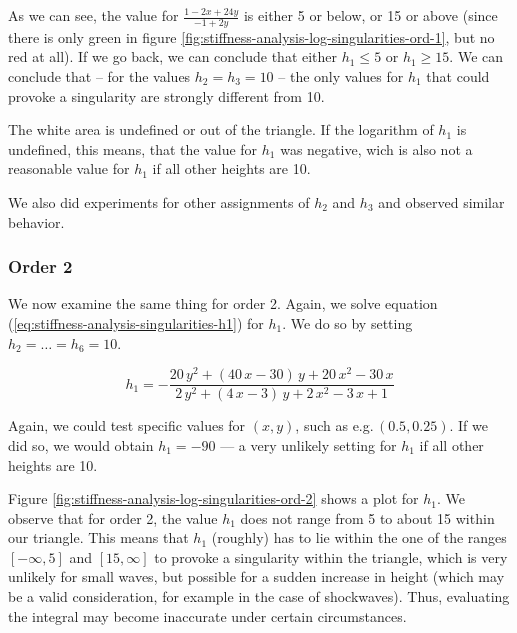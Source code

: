 \documentclass{article}
\begin{document}
As we can see, the value for $\frac{1-2x+24y}{-1+2y}$ is either 5 or below, or 15 or above (since there is only green in figure \ref{fig:stiffness-analysis-log-singularities-ord-1}, but no red at all). If we go back, we can conclude that either $h_1 \leq 5$ or $h_1 \geq 15$. We can conclude that -- for the values $h_2=h_3=10$ -- the only values for $h_1$ that could provoke a singularity are strongly different from 10.

The white area is undefined or out of the triangle. If the logarithm of $h_1$ is undefined, this means, that the value for $h_1$ was negative, wich is also not a reasonable value for $h_1$ if all other heights are 10.

We also did experiments for other assignments of $h_2$ and $h_3$ and observed similar behavior.

\subsubsection{Order 2}
\label{sec:stiffness-analysis-singularities-ord-2}

We now examine the same thing for order 2. Again, we solve equation (\ref{eq:stiffness-analysis-singularities-h1}) for $h_1$. We do so by setting $h_2=\dots=h_6=10$.


\begin{equation*}
  h_1 = -\frac{20\,y^2+\left(40\,x-30\right)\,y+20\,x^2-30\,x}{2\,y^2+
    \left(4\,x-3\right)\,y+2\,x^2-3\,x+1}
\end{equation*}

Again, we could test specific values for $(x,y)$, such as e.g.\,$(0.5, 0.25)$. If we did so, we would obtain $h_1=-90$ --- a very unlikely setting for $h_1$ if all other heights are 10.

Figure \ref{fig:stiffness-analysis-log-singularities-ord-2} shows a plot for $h_1$. We observe that for order 2, the value $h_1$ does not range from 5 to about 15 within our triangle. This means that $h_1$ (roughly) has to lie within the one of the ranges $\left[ -\infty, 5 \right]$ and $\left[ 15, \infty \right]$ to provoke a singularity within the triangle, which is very unlikely for small waves, but possible for a sudden increase in height (which may be a valid consideration, for example in the case of shockwaves). Thus, evaluating the integral may become inaccurate under certain circumstances.
\end{document}
